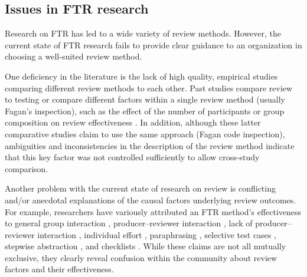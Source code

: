 
\subsection{Issues in FTR research}
\label{sec:research}

Research on FTR has led to a wide variety of review methods.  However,
the current state of FTR research fails to provide clear guidance to
an organization in choosing a well-suited review method.

One deficiency in the literature is the lack of high quality, empirical
studies comparing different review methods to each other.  Past studies
compare review to testing \cite{Basili85,Myers78} or compare different
factors within a single review method (usually Fagan's inspection), such as
the effect of the number of participants or group composition on review
effectiveness \cite{Bisant89,Martin90}.  In addition, although these latter
comparative studies claim to use the same approach (Fagan code inspection),
ambiguities and inconsistencies in the description of the review method
indicate that this key factor was not controlled sufficiently to allow
cross-study comparison.

Another problem with the current state of research on review is conflicting
and/or anecdotal explanations of the causal factors underlying review
outcomes.  For example, researchers have variously attributed an FTR
method's effectiveness to general group interaction \cite{Dunn90,Peele82},
producer--reviewer interaction \cite{Myers78,Parnas85}, lack of
producer--reviewer interaction \cite{Ackerman89,Russell91},
individual effort \cite{Humphrey90}, paraphrasing \cite{Fagan76}, selective
test cases \cite{Ackerman89}, stepwise abstraction \cite{Selby85}, and
checklists \cite{Knight91}.  While these claims are not all mutually
exclusive, they clearly reveal confusion within the community about review
factors and their effectiveness.

